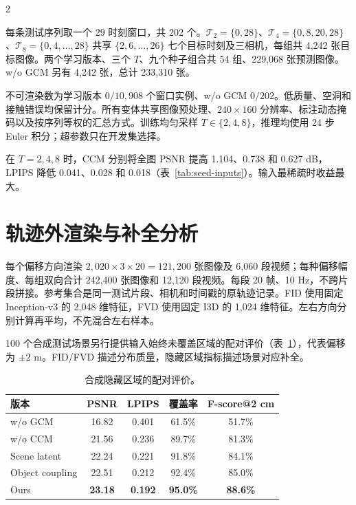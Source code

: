 \begin{multicols}{2}

每条测试序列取一个 29 时刻窗口，共 202 个。$\mathcal T_2=\{0,28\}$、$\mathcal T_4=\{0,8,20,28\}$、$\mathcal T_8=\{0,4,\ldots,28\}$ 共享 $\{2,6,\ldots,26\}$ 七个目标时刻及三相机，每组共 4,242 张目标图像。两个学习版本、三个 $T$、九个种子组合共 54 组、229,068 张预测图像。w/o GCM 另有 4,242 张，总计 233,310 张。

不可渲染数为学习版本 $0/10,908$ 个窗口实例、w/o GCM $0/202$。低质量、空洞和接触错误均保留计分。所有变体共享图像预处理、$240\times160$ 分辨率、标注动态掩码以及按序列等权的汇总方式。训练均匀采样 $T\in\{2,4,8\}$，推理均使用 24 步 Euler 积分；超参数只在开发集选择。

在 $T=2,4,8$ 时，CCM 分别将全图 PSNR 提高 1.104、0.738 和 0.627 dB，LPIPS 降低 0.041、0.028 和 0.018（表~\ref{tab:seed-inputs}）。输入最稀疏时收益最大。

\section{轨迹外渲染与补全分析}
\label{sec:supp-hidden}

每个偏移方向渲染 $2,020\times3\times20=121,200$ 张图像及 6,060 段视频；每种偏移幅度、每组双向合计 242,400 张图像和 12,120 段视频。每段 20 帧、10 Hz，不跨片段拼接。参考集合是同一测试片段、相机和时间戳的原轨迹记录。FID 使用固定 Inception-v3 的 2,048 维特征，FVD 使用固定 I3D 的 1,024 维特征。左右方向分别计算再平均，不先混合左右样本。

100 个合成测试场景另行提供输入始终未覆盖区域的配对评价（表~\ref{tab:hidden-regions}），代表偏移为 $\pm2$ m。FID/FVD 描述分布质量，隐藏区域指标描述场景对应补全。

\begin{table}[H]
\centering\small
\setlength{\tabcolsep}{4pt}
\caption{合成隐藏区域的配对评价。}
\label{tab:hidden-regions}
\begin{tabular}{@{}lcccc@{}}
\toprule
版本 & PSNR & LPIPS & 覆盖率 & F-score@2 cm \\
\midrule
w/o GCM & 16.82 & 0.401 & 61.5\% & 51.7\% \\
w/o CCM & 21.56 & 0.236 & 89.7\% & 81.3\% \\
Scene latent & 22.24 & 0.221 & 91.8\% & 84.1\% \\
Object coupling & 22.51 & 0.212 & 92.4\% & 85.0\% \\
Ours & \textbf{23.18} & \textbf{0.192} & \textbf{95.0\%} & \textbf{88.6\%} \\
\bottomrule
\end{tabular}
\end{table}


\end{multicols}
